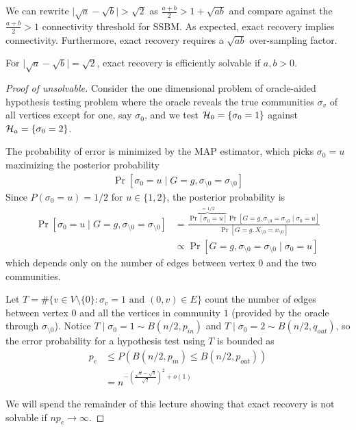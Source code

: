 \begin{remark}
  We can rewrite $\lvert \sqrt{a} - \sqrt{b} \rvert > \sqrt{2}$
  as $\frac{a + b}{2} > 1 + \sqrt{ab}$ and compare against
  the $\frac{a+b}{2} > 1$ connectivity threshold for SSBM.
  As expected, exact recovery implies connectivity.
  Furthermore, exact recovery requires a $\sqrt{ab}$ over-sampling factor.
\end{remark}

\begin{remark}
  For $\lvert \sqrt{a} - \sqrt{b} \rvert = \sqrt{2}$, exact recovery
  is efficiently solvable if $a,b > 0$.
\end{remark}

\begin{proof}[Proof of unsolvable]
  Consider the one dimensional problem of oracle-aided hypothesis testing
  problem where the oracle reveals the true communities $\sigma_v$
  of all vertices except for one, say $\sigma_0$, and
  we test $\mathcal{H}_0 = \{\sigma_0 = 1\}$ against $\mathcal{H}_a = \{ \sigma_0 = 2\}$.

  The probability of error is minimized by the MAP estimator, which
  picks $\sigma_0 = u$ maximizing the posterior probability
  \begin{align}
    \Pr[\sigma_0 = u \mid G = g, \sigma_{\setminus 0} = \sigma_{\setminus 0}]
  \end{align}
  Since $P(\sigma_0 = u) = 1/2$ for $u \in \{1,2\}$,
  the posterior probability is
  \begin{align}
    \Pr[\sigma_0 = u \mid G = g, \sigma_{\setminus 0} = \sigma_{\setminus 0}]
    &= \frac{\overbrace{\Pr[ \sigma_0 = u ]}^{=1/2}
      \Pr[G = g, \sigma_{\setminus 0} = \sigma_{\setminus 0} \mid \sigma_0 = u]
      }{
    \Pr[G = g, X_{\setminus 0} = x_{\setminus 0}]} \\
    &\propto
    \Pr[G = g, \sigma_{\setminus 0} = \sigma_{\setminus 0} \mid \sigma_0 = u]
  \end{align}
  which depends only on the number of edges between vertex $0$ and the two
  communities.

  Let $T = \#\{v \in V \setminus \{0\} : \sigma_v = 1 \text{ and } (0,v) \in E\}$
  count the number of edges between vertex $0$ and all the vertices in
  community $1$ (provided by the oracle through $\sigma_{\setminus 0}$).
  Notice $T \mid \sigma_0 = 1 \sim B(n/2, p_{in})$ and
  $T \mid \sigma_0 = 2 \sim B(n/2, q_{out})$, so
  the error probability for a hypothesis test using $T$
  is bounded as
  \begin{align}
    p_e
    &\leq P(B(n/2, p_{in}) \leq B(n/2, p_{out})) \\
    &= n^{-\left(\frac{\sqrt{a} - \sqrt{b}}{\sqrt{2}}\right)^2 + o(1)}
  \end{align}

  We will spend the remainder of this lecture showing that exact recovery is
  not solvable if $n p_e \to \infty$.
\end{proof}


